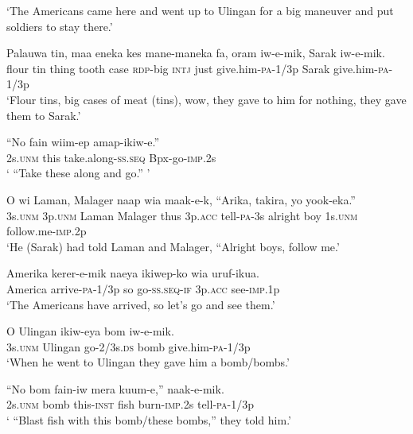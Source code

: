 \glt ‘The Americans came here and went up to Ulingan for a big maneuver and put soldiers to stay there.’ \\
\z


\ea\label{ex:a:x121}
\gll  Palauwa  tin,  maa  eneka  kes  mane-maneka  fa,     oram  iw-e-mik,  Sarak  iw-e-mik. \\
flour  tin  thing  tooth  case  \textsc{rdp}-big  \textsc{intj}              just  give.him-\textsc{pa}-1/3p  Sarak  give.him-\textsc{pa}-1/3p \\


\glt ‘Flour tins, big cases of meat (tins), wow, they gave to him for nothing, they gave them to Sarak.’ \\
\z


\ea\label{ex:a:x122}
\gll  “No  fain  wiim-ep  amap-ikiw-e.” \\
2s.\textsc{unm}  this  take.along-\textsc{ss.seq}  Bpx-go-\textsc{imp}.2s \\
\glt ‘ “Take these along and go.” ’ \\
\z


\ea\label{ex:a:x123}
\gll  O  wi  Laman,  Malager  naap  wia  maak-e-k,        “Arika,  takira,  yo  yook-eka.” \\
3s.\textsc{unm}  3p.\textsc{unm}  Laman  Malager  thus  3p.\textsc{acc}  tell-\textsc{pa}-3s  alright  boy  1s.\textsc{unm}  follow.me-\textsc{imp}.2p \\


\glt ‘He (Sarak) had told Laman and Malager, “Alright boys, follow me.’ \\
\z


\ea\label{ex:a:x124}
\gll  Amerika  kerer-e-mik  naeya  ikiwep-ko  wia  uruf-ikua. \\
America  arrive-\textsc{pa}-1/3p  so  go-\textsc{ss.seq}-\textsc{if}  3p.\textsc{acc}  see-\textsc{imp}.1p \\
\glt ‘The Americans have arrived, so let’s go and see them.’ \\
\z


\ea\label{ex:a:x125}
\gll  O  Ulingan  ikiw-eya  bom  iw-e-mik. \\
3s.\textsc{unm}  Ulingan  go-2/3s.\textsc{ds}  bomb  give.him-\textsc{pa}-1/3p \\
\glt ‘When he went to Ulingan they gave him a bomb/bombs.’ \\
\z


\ea\label{ex:a:x126}
\gll  “No  bom  fain-iw  mera  kuum-e,”  naak-e-mik. \\
2s.\textsc{unm}  bomb  this-\textsc{inst}  fish  burn-\textsc{imp}.2s  tell-\textsc{pa}-1/3p \\
\glt ‘ “Blast fish with this bomb/these bombs,” they told him.’ \\
\z


